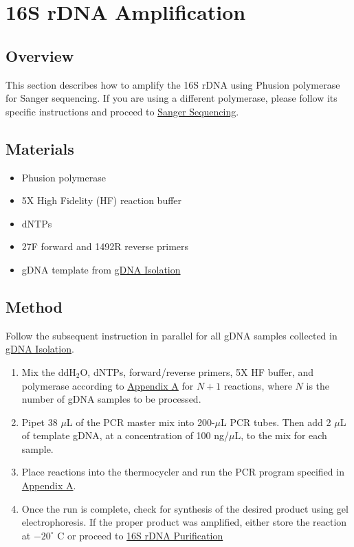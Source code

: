 \documentclass[onecolumn]{article}
\begin{document}
\section{16S rDNA Amplification}\label{1rA}
\subsection{Overview}
This section describes how to amplify the 16S rDNA using Phusion polymerase for Sanger sequencing.
If you are using a different polymerase,
please follow its specific instructions and proceed to \hyperref[SS]{Sanger Sequencing}.

\subsection{Materials}
\begin{itemize}
  \item Phusion polymerase
  \item 5X High Fidelity (HF) reaction buffer
  \item dNTPs
  \item 27F forward and 1492R reverse primers
  \item gDNA template from \hyperref[GI]{gDNA Isolation}
\end{itemize}

\subsection{Method}
Follow the subsequent instruction in parallel for all gDNA samples collected in \hyperref[GI]{gDNA Isolation}.
\begin{enumerate}
  \item Mix the ddH$_2$O, dNTPs, forward/reverse primers, 5X HF buffer, and polymerase according to \hyperref[aA]{Appendix A} for $N+1$ reactions, where $N$ is the number of gDNA samples to be processed.
  \item Pipet 38 $\mu$L of the PCR master mix into 200-$\mu$L PCR tubes. Then add 2 $\mu$L of template gDNA, at a concentration of 100 ng/$\mu$L, to the mix for each sample.
  \item Place reactions into the thermocycler and run the PCR program specified in \hyperref[aA]{Appendix A}.
  \item Once the run is complete, check for synthesis of the desired product using gel electrophoresis. If the proper product was amplified, either store the reaction at $-20^\circ$ C or proceed to \hyperref[1rP]{16S rDNA Purification}
\end{enumerate}
\end{document}

